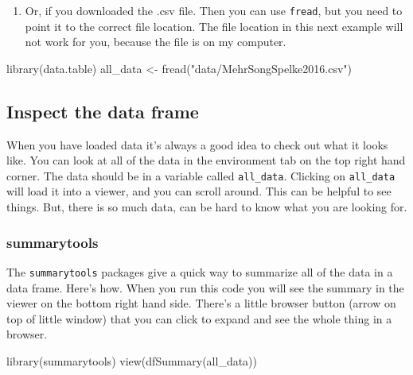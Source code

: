 \documentclass[
]{book}
\newenvironment{Shaded}{\begin{snugshade}}{\end{snugshade}}
\newcommand{\FunctionTok}[1]{\textcolor[rgb]{0.00,0.00,0.00}{#1}}
\newcommand{\NormalTok}[1]{#1}
\newcommand{\OtherTok}[1]{\textcolor[rgb]{0.56,0.35,0.01}{#1}}
\newcommand{\StringTok}[1]{\textcolor[rgb]{0.31,0.60,0.02}{#1}}
\providecommand{\tightlist}{%
  \setlength{\itemsep}{0pt}\setlength{\parskip}{0pt}}
\begin{document}
\begin{enumerate}
\def\labelenumi{\arabic{enumi}.}
\setcounter{enumi}{1}
\tightlist
\item
  Or, if you downloaded the .csv file. Then you can use \texttt{fread}, but you need to point it to the correct file location. The file location in this next example will not work for you, because the file is on my computer.
\end{enumerate}

\begin{Shaded}
\begin{Highlighting}[]
\FunctionTok{library}\NormalTok{(data.table)}
\NormalTok{all\_data }\OtherTok{\textless{}{-}} \FunctionTok{fread}\NormalTok{(}\StringTok{"data/MehrSongSpelke2016.csv"}\NormalTok{)}
\end{Highlighting}
\end{Shaded}

\hypertarget{inspect-the-data-frame}{%
\subsection{Inspect the data frame}\label{inspect-the-data-frame}}

When you have loaded data it's always a good idea to check out what it looks like. You can look at all of the data in the environment tab on the top right hand corner. The data should be in a variable called \texttt{all\_data}. Clicking on \texttt{all\_data} will load it into a viewer, and you can scroll around. This can be helpful to see things. But, there is so much data, can be hard to know what you are looking for.

\hypertarget{summarytools-1}{%
\subsubsection{summarytools}\label{summarytools-1}}

The \texttt{summarytools} packages give a quick way to summarize all of the data in a data frame. Here's how. When you run this code you will see the summary in the viewer on the bottom right hand side. There's a little browser button (arrow on top of little window) that you can click to expand and see the whole thing in a browser.

\begin{Shaded}
\begin{Highlighting}[]
\FunctionTok{library}\NormalTok{(summarytools)}
\FunctionTok{view}\NormalTok{(}\FunctionTok{dfSummary}\NormalTok{(all\_data))}
\end{Highlighting}
\end{Shaded}
\end{document}
